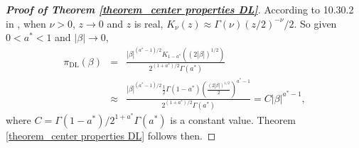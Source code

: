 \documentclass[12pt]{article}
\begin{document}
\begin{proof} [\textbf{Proof of Theorem \ref{theorem_center properties DL}}]
	According to  %
	{10.30.2} in \cite{NISTDLMF}, when $\nu>0$,  $z\rightarrow0$ and $z$ is   real, $K_\nu (z) \approx   \Gamma(\nu) (z/2)^{-\nu} /2$.
	So  given $0<a^\ast<1$ and  $|\beta|\rightarrow0$,
	\begin{eqnarray*}
		\pi_{\text{DL}}(\beta)
		&	= & \frac{|\beta|^{(a^\ast-1)/2} K_{1-a^\ast} ( {(2|\beta|)^{1/2}})}{2^{(1+a^\ast)/2}\Gamma(a^\ast)}   \\
		& \approx  &  \frac{|\beta|^{(a^\ast-1)/2} \frac{1}{2} \Gamma(1-a^\ast) (\frac{(2|\beta|)^{1/2}}{2} )^{a^\ast-1}
		}{2^{(1+a^\ast)/2}\Gamma(a^\ast)}
		=  C|\beta|^{a^\ast-1} ,   %
	\end{eqnarray*}
	where $C= { \Gamma(1-a^\ast) } / {2^{1+a^\ast}\Gamma(a^\ast)} $ is a constant value.  Theorem \ref{theorem_center properties DL} follows then.
\end{proof}
\end{document}
